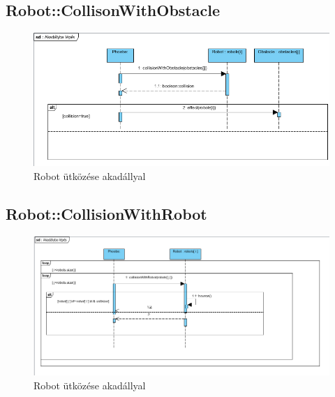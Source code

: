 \subsection{Robot::CollisonWithObstacle}
\begin{figure}[h]
\begin{center}
\includegraphics[width=17cm]{images/collisionWithObstacle()_sequence.PNG}
\caption{Robot ütközése akadállyal}
\label{fig:example4}
\end{center}
\end{figure}
\pagebreak

\subsection{Robot::CollisionWithRobot}
\begin{figure}[h]
\begin{center}
\includegraphics[width=17cm]{images/collisionWithRobot()_sequence.PNG}
\caption{Robot ütközése akadállyal}
\label{fig:example5}
\end{center}
\end{figure}
\pagebreak

